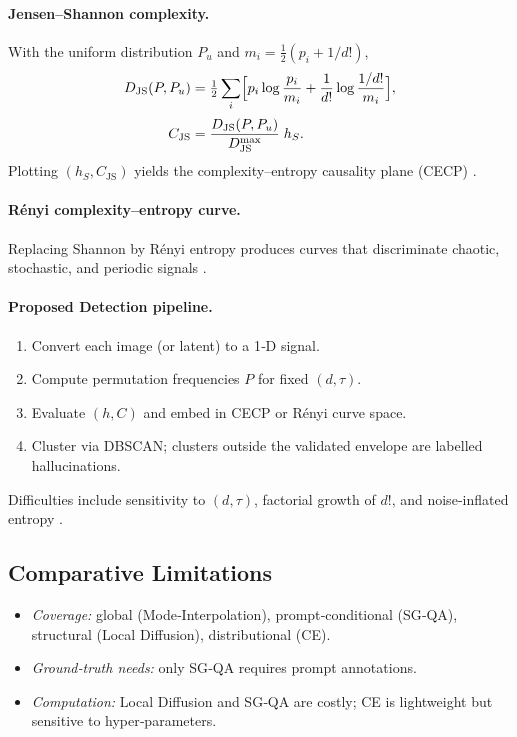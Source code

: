 \documentclass{article}
\begin{document}
\paragraph{Jensen–Shannon complexity.}
With the uniform distribution $P_u$ and $m_i=\tfrac12(p_i+1/d!)$,
\begin{align}
D_{\mathrm{JS}}(P,P_u) &=
\tfrac12\sum_{i}\Bigl[p_i\log\frac{p_i}{m_i}+
\frac{1}{d!}\log\frac{1/d!}{m_i}\Bigr],\\[2pt]
C_{\mathrm{JS}} &=
\frac{D_{\mathrm{JS}}(P,P_u)}{D_{\mathrm{JS}}^{\max}}\;h_S.
\end{align}
Plotting $(h_S,C_{\mathrm{JS}})$ yields the complexity–entropy
causality plane (CECP) \citep{PhysRevE.95.062106}.%

\paragraph{Rényi complexity–entropy curve.}
Replacing Shannon by Rényi entropy produces curves that discriminate
chaotic, stochastic, and periodic signals
\citep{RePEc:eee:phsmap:v:498:y:2018:i:c:p:74-85}.%

\paragraph{Proposed Detection pipeline.}
\begin{enumerate}
\item Convert each image (or latent) to a 1‑D signal.
\item Compute permutation frequencies $P$ for fixed $(d,\tau)$.
\item Evaluate $(h,C)$ and embed in CECP or Rényi curve space.
\item Cluster via DBSCAN; clusters outside the validated envelope are
      labelled hallucinations.
\end{enumerate}

Difficulties include sensitivity to $(d,\tau)$, factorial growth of
$d!$, and noise‑inflated entropy
\citep{2016NTA.....7...21C}.%

\subsection{Comparative Limitations}
\begin{itemize}
\item \emph{Coverage:} global (Mode‑Interpolation), prompt‑conditional
      (SG‑QA), structural (Local Diffusion), distributional (CE).
\item \emph{Ground‑truth needs:} only SG‑QA requires prompt annotations.
\item \emph{Computation:} Local Diffusion and SG‑QA are costly; CE is
      lightweight but sensitive to hyper‑parameters.
\end{itemize}
\end{document}
